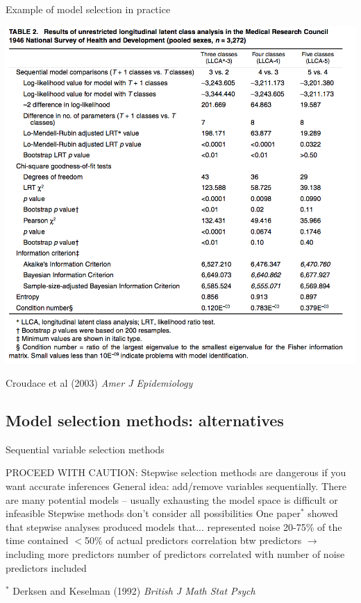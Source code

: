 
\begin{frame}{Example of model selection in practice}

\includegraphics[width=.8\linewidth]{8-2_model_select/figures/modelSelectionExample2.png}

\tiny  Croudace et al (2003) {\em Amer J Epidemiology}

\end{frame}


\subsection{Model selection methods: alternatives}





\begin{frame}{Sequential variable selection methods}

\begin{block}{PROCEED WITH CAUTION: Stepwise selection methods are dangerous if you want accurate inferences}
\bi
    \myitem General idea: add/remove variables sequentially.
    \myitem There are many potential models -- usually exhausting the model space is difficult or infeasible
	\myitem Stepwise methods don't consider all possibilities
    \myitem One paper$^*$ showed that stepwise analyses produced models that...
        \bi
                \myitem represented noise 20-75\% of the time
                \myitem contained $<$50\% of actual predictors
                \myitem correlation btw predictors $\longrightarrow$ including more predictors
                \myitem number of predictors correlated with number of noise predictors included
        \ei
\ei
\end{block}
\tiny $^*$ Derksen and Keselman (1992) {\em British J Math Stat Psych}

\end{frame}

